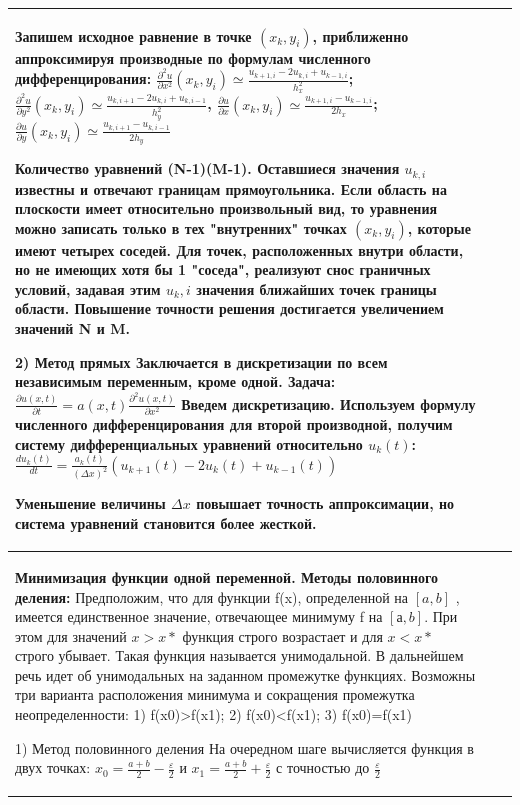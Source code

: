 \documentclass[a4paper,2pt]{article}
\begin{document}
\begin{tabular}{|p{}|p{}|p{}|}
Запишем исходное равнение в точке $(x_k,y_i)$, приближенно аппроксимируя производные по формулам численного дифференцирования:
$\frac{\partial^2u}{\partial x^2}(x_k, y_i)\simeq\frac{u_{k+1,i} - 2u_{k,i} + u_{k-1,i}}{h^2_x}$; $\frac{\partial^2u}{\partial y^2}(x_k, y_i)\simeq\frac{u_{k,i+1} - 2u_{k,i} + u_{k,i-1}}{h^2_y}$,
$\frac{\partial u}{\partial x}(x_k, y_i)\simeq\frac{u_{k+1,i} - u_{k-1,i}}{2h_x}$; $\frac{\partial u}{\partial y}(x_k, y_i)\simeq\frac{u_{k,i+1} - u_{k,i-1}}{2h_y}$

Количество уравнений (N-1)(M-1). Оставшиеся значения $u_{k,i}$ известны и отвечают границам прямоугольника.
Если область на плоскости имеет относительно произвольный вид, то уравнения можно записать только в тех "внутренних" точках $(x_k, y_i)$, которые имеют четырех соседей. Для точек, расположенных внутри области, но не имеющих хотя бы 1 "соседа", реализуют снос граничных условий, задавая этим $u_k,i$ значения ближайших точек границы области. Повышение точности решения достигается увеличением значений N и M.

2) Метод прямых
 Заключается в дискретизации по всем независимым переменным, кроме одной.
 Задача: $\frac{\partial u(x,t)}{\partial t} = a(x,t)\frac{\partial^2 u(x,t)}{\partial x^2}$
 Введем дискретизацию. Используем формулу численного дифференцирования для второй производной, получим систему дифференциальных уравнений относительно $u_k(t)$:
 $\frac{du_k(t)}{dt} = \frac{a_k(t)}{(\Delta x)^2}(u_{k+1}(t) - 2u_k(t) + u_{k-1}(t))$

Уменьшение величины $\Delta x$ повышает точность аппроксимации, но система уравнений становится более жесткой.

\\\hline


\textbf{Минимизация функции одной переменной. Методы половинного деления:}
Предположим, что для функции f(x), определенной на \([a, b]\) , имеется единственное значение, отвечающее минимуму f на \([а ,b]\). При этом для значений \(x>x*\) функция строго возрастает и для \(x<x*\) строго убывает. Такая функция называется унимодальной. В дальнейшем речь идет об унимодальных на заданном промежутке функциях.
Возможны три варианта расположения минимума и сокращения промежутка неопределенности: 1) f(x0)>f(x1); 2) f(x0)<f(x1); 3) f(x0)=f(x1)

1) Метод половинного деления
На очередном шаге вычисляется функция в двух точках:
$x_0 = \frac{a+b}{2} - \frac{\varepsilon}{2}$ и $x_1 = \frac{a+b}{2} + \frac{\varepsilon}{2}$ с точностью до $\frac{\varepsilon}{2}$


\end{tabular}
\end{document}
